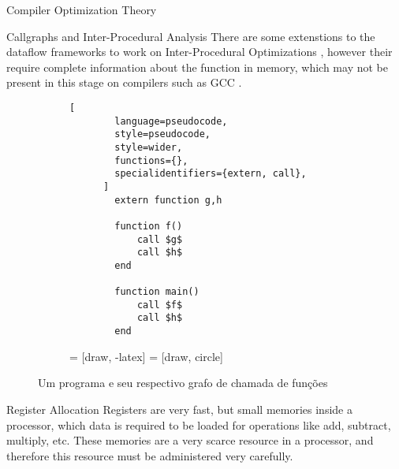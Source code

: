 \begin{section}{Compiler Optimization Theory}
\begin{section}{Callgraphs and Inter-Procedural Analysis}
There are some extenstions to the dataflow frameworks to work on Inter-Procedural
Optimizations \citep{khedker2009data}, however their require complete information
about the function in memory, which may not be present in this stage on compilers
such as GCC \citep{gcc_ipa}.

\begin{figure}[ht]
\centering
  \begin{subfigure}[b]{0.40\textwidth}
      \begin{lstlisting}[
        language=pseudocode,
        style=pseudocode,
        style=wider,
        functions={},
        specialidentifiers={extern, call},
      ]
        extern function g,h

        function f()
            call $g$
            call $h$
        end

        function main()
            call $f$
            call $h$
        end
      \end{lstlisting}
  \end{subfigure}
  \begin{subfigure}[b]{0.40\textwidth}
     = [draw, -latex]
     = [draw, circle]
    \begin{center}
    \end{center}
  \end{subfigure}
  \caption{Um programa e seu respectivo grafo de chamada de funções}
  \label{fig:call_graph}
\end{figure}

\begin{subsection}{Register Allocation}
	Registers are very fast, but small memories inside a processor, which data is
	required to be loaded for operations like add, subtract, multiply, etc. These
	memories are a very scarce resource in a processor, and therefore this resource
	must be administered very carefully.


\end{subsection}
\end{section}
\end{section}
